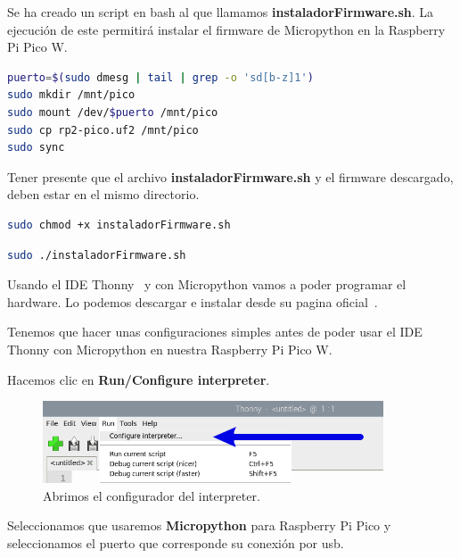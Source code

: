 Se ha creado un script en bash al que llamamos \textbf{instaladorFirmware.sh}. La ejecución de este permitirá instalar el firmware de Micropython en la Raspberry Pi Pico W.


\begin{lstlisting}[language=sh, firstnumber=0, basicstyle=\normalsize, caption={Script en bash para instalar el firmware Micropython.}] 
puerto=$(sudo dmesg | tail | grep -o 'sd[b-z]1')
sudo mkdir /mnt/pico
sudo mount /dev/$puerto /mnt/pico
sudo cp rp2-pico.uf2 /mnt/pico
sudo sync
\end{lstlisting}

Tener presente que el archivo \textbf{instaladorFirmware.sh} y el firmware descargado, deben estar en el mismo directorio.

\begin{lstlisting}[language=sh, firstnumber=0, basicstyle=\normalsize, caption={Comando para dar permisos de ejecución.}] 
sudo chmod +x instaladorFirmware.sh\end{lstlisting}

\begin{lstlisting}[language=sh, firstnumber=0, basicstyle=\normalsize, caption={Comando para ejecutar el instalador de Firmware.}] 
sudo ./instaladorFirmware.sh\end{lstlisting}


Usando el IDE Thonny~\cite{misc:Thonny} y con Micropython vamos a poder programar el hardware. Lo podemos descargar e instalar desde su pagina oficial~\cite{misc:Thonny}.

Tenemos que hacer unas configuraciones simples antes de poder usar el IDE Thonny con Micropython en nuestra Raspberry Pi Pico W.

Hacemos clic en \textbf{Run/Configure interpreter}.

\begin{figure}[h]
	\centering
	\includegraphics[width=0.9\textwidth]{img/desarrollo/thonny_interpreter.png}
	\caption{Abrimos el configurador del interpreter.}
\end{figure}

Seleccionamos que usaremos \textbf{Micropython} para Raspberry Pi Pico y seleccionamos el puerto que corresponde su conexión por usb.

